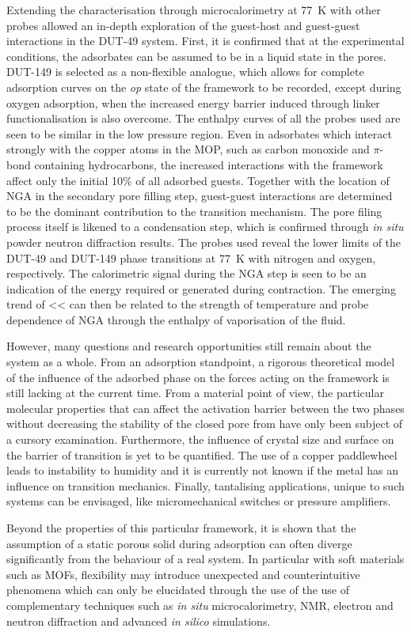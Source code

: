 Extending the characterisation through microcalorimetry at \SI{77}{\kelvin}
with other probes allowed an in-depth exploration of the guest-host and 
guest-guest interactions in the DUT-49 system. First, it is confirmed 
that at the experimental conditions, the adsorbates can be assumed to 
be in a liquid state in the pores. DUT-149 is selected as a non-flexible 
analogue, which allows for complete adsorption curves on the \textit{op}
state of the framework to be recorded, except during oxygen adsorption,
when the increased energy barrier induced through linker functionalisation
is also overcome. The enthalpy curves of all the probes used are seen to 
be similar in the low pressure region. Even in adsorbates which interact 
strongly with the copper atoms in the MOP, such as carbon monoxide and 
\(\pi\)-bond containing hydrocarbons, the increased interactions with the 
framework affect only the initial 10\% of all adsorbed guests. Together
with the location of NGA in the secondary pore filling step,
guest-guest interactions are determined to be the dominant contribution 
to the transition mechanism. The pore filing process itself is likened
to a condensation step, which is confirmed through \textit{in situ}
powder neutron diffraction results.
The probes used reveal the lower limits of the DUT-49
and DUT-149 phase transitions at \SI{77}{\kelvin} with nitrogen and 
oxygen, respectively. The calorimetric signal during the NGA step
is seen to be an indication of the energy required or generated 
during contraction. The emerging trend of <<
can then be related to the strength of temperature and probe dependence
of NGA through the enthalpy of vaporisation of the fluid.

However, many questions and research opportunities still remain about the 
system as a whole. From an adsorption standpoint, a rigorous theoretical 
model of the influence of the adsorbed phase on the forces acting on the
framework is still lacking at the current time.
From a material point of view, the particular molecular properties that 
can affect the activation barrier between the two phases without 
decreasing the stability of the closed pore from have only been 
subject of a cursory examination.
Furthermore, the influence of crystal size and surface on the
barrier of transition is yet to be quantified. The use of a copper 
paddlewheel leads to instability to humidity and it is currently
not known if the metal has an influence on transition mechanics.
Finally, tantalising applications, unique to such systems can be 
envisaged, like micromechanical switches or pressure amplifiers.

Beyond the properties of this particular framework, it is shown that 
the assumption of a static porous solid during adsorption can often
diverge significantly from the behaviour of a real system. In particular
with soft materials such as MOFs, flexibility may introduce 
unexpected and counterintuitive phenomena which can only be elucidated 
through the use of the use of complementary techniques such as 
\textit{in situ} microcalorimetry, NMR, electron and neutron diffraction 
and advanced \textit{in silico} simulations.

\FloatBarrier%
\pagebreak